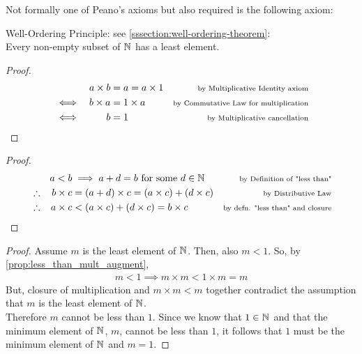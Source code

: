 \documentclass[../MathsNotesBase.tex]{subfiles}
\begin{document}
{		Not formally one of Peano's axioms but also required is the following axiom:
		\begin{axiom}{Well-Ordering Principle: see \ref{sssection:well-ordering-theorem}:}\\ Every non-empty subset of $\mathbb{N}^{}$ has a least element.
		\end{axiom}
		
	
		\bigskip
		
		\biggerskip		
			\begin{proof}
			\begin{align*}
			&& a \times b &= a = a \times 1 &\text{\scriptsize{by Multiplicative Identity axiom}}\\
			&\iff & b \times a &= 1 \times a  &\text{\scriptsize{by Commutative Law for multiplication}}\\
			&\iff & b &= 1  &\text{\scriptsize{by Multiplicative cancellation}}\\
			\end{align*}
			\end{proof}
		
			\begin{proof}
			\begin{align*}
			&& a < b &\implies a + d = b \text{ for some } d \in \mathbb{N}^{} &\text{\scriptsize{by Definition of "less than"}}\\
			&\therefore & b \times c &= (a + d) \times c = (a \times c) + (d \times c)  &\text{\scriptsize{by Distributive Law}}\\
			&\therefore & a \times c &< (a \times c) + (d \times c) = b \times c  &\text{\scriptsize{by defn. "less than" and closure}}
			\end{align*}
			\end{proof}
		
		\begin{proof}
			Assume $m$ is the least element of $\mathbb{N}^{}$. Then, also $m < 1$. So, by \autoref{prop:less_than_mult_augment},
			\begin{align*}
			m < 1 \implies m \times m < 1 \times m = m
			\end{align*}
			But, closure of multiplication and $m \times m < m$ together contradict the assumption that $m$ is the least element of $\mathbb{N}^{}$.\\
			Therefore $m$ cannot be less than $1$. Since we know that $1 \in \mathbb{N}^{}$ and that the minimum element of $\mathbb{N}^{}$, $m$, cannot be less than $1$, it follows that $1$ must be the minimum element of $\mathbb{N}^{}$ and $m = 1$.
		\end{proof}
	
}
\end{document}
